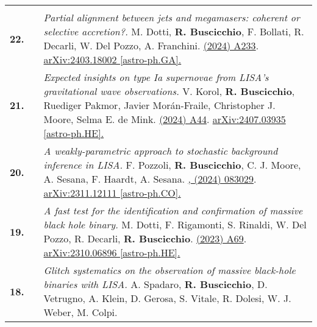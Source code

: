 {\begin{longtable}{rp{0.3cm}p{15.8cm}}
\vspace{0.09cm}\\
%
\textbf{22.} & & \textit{Partial alignment between jets and megamasers: coherent or selective accretion?.}
\newline{}
M. Dotti, \textbf{R. Buscicchio}, F. Bollati, R. Decarli, W. Del Pozzo, A. Franchini.
\newline{}
\href{https://doi.org/10.1051/0004-6361/202450112}{\aap 692 (2024) A233}. \href{https://arxiv.org/abs/2403.18002}{arXiv:2403.18002 [astro-ph.GA].}
\vspace{0.09cm}\\
%
\textbf{21.} & & \textit{Expected insights on type Ia supernovae from LISA's gravitational wave observations.}
\newline{}
V. Korol, \textbf{R. Buscicchio}, Ruediger Pakmor, Javier Morán-Fraile, Christopher J. Moore, Selma E. de Mink.
\newline{}
\href{https://www.aanda.org/articles/aa/full_html/2024/11/aa51380-24/aa51380-24.html}{\aap 691 (2024) A44}. \href{https://arxiv.org/abs/2407.03935}{arXiv:2407.03935 [astro-ph.HE].}
\vspace{0.09cm}\\
%
\textbf{20.} & & \textit{A weakly-parametric approach to stochastic background inference in LISA.}
\newline{}
F. Pozzoli, \textbf{R. Buscicchio}, C. J. Moore, A. Sesana, F. Haardt, A. Sesana.
\newline{}
\href{https://journals.aps.org/prd/abstract/10.1103/PhysRevD.109.083029}{\prd 109, (2024) 083029}. \href{https://arxiv.org/abs/2311.12111}{arXiv:2311.12111 [astro-ph.CO].}
\vspace{0.09cm}\\
%
\textbf{19.} & & \textit{A fast test for the identification and confirmation of massive black hole binary.}
\newline{}
M. Dotti, F. Rigamonti, S. Rinaldi, W. Del Pozzo, R. Decarli, \textbf{R. Buscicchio}.
\newline{}
\href{https://www.aanda.org/articles/aa/abs/2023/12/aa46916-23/aa46916-23.html}{\aap 680 (2023) A69}. \href{https://arxiv.org/abs/2310.06896}{arXiv:2310.06896 [astro-ph.HE].}
\vspace{0.09cm}\\
%
\textbf{18.} & & \textit{Glitch systematics on the observation of massive black-hole binaries with LISA.}
\newline{}
A. Spadaro, \textbf{R. Buscicchio}, D. Vetrugno, A. Klein, D. Gerosa, S. Vitale, R. Dolesi, W. J. Weber, M. Colpi.

\end{longtable}}
